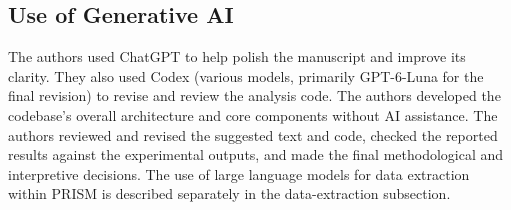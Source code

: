\subsection{Use of Generative AI}

The authors used ChatGPT to help polish the manuscript and improve its clarity. They also used Codex (various models, primarily GPT-6-Luna for the final revision) to revise and review the analysis code. The authors developed the codebase’s overall architecture and core components without AI assistance.
The authors reviewed and revised the suggested text and code, checked the reported results against the experimental outputs, and made the final methodological and interpretive decisions.
The use of large language models for data extraction within PRISM is described separately in the data-extraction subsection.
